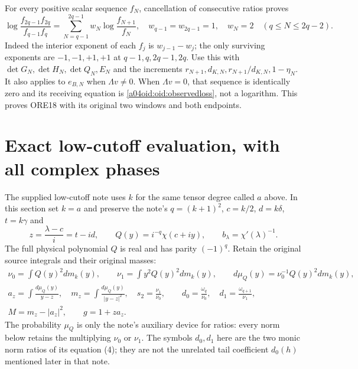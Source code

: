 For every positive scalar sequence $f_N$, cancellation of consecutive
ratios proves
\begin{equation}\label{a04oid:oid:windows}
 \log\frac{f_{2q-1}f_{2q}}{f_{q-1}f_q}
 =\sum_{N=q-1}^{2q-1}w_N\log\frac{f_{N+1}}{f_N},\quad
 w_{q-1}=w_{2q-1}=1,\quad w_N=2\quad(q\le N\le2q-2).
\end{equation}
Indeed the interior exponent of each $f_j$ is $w_{j-1}-w_j$;
the only surviving exponents are $-1,-1,+1,+1$ at
$q-1,q,2q-1,2q$. Use this with $\det G_N,\det H_N,\det Q_N,E_N$
and the increments $r_{N+1},d_{K,N},r_{N+1}/d_{K,N},1-\eta_N$.
It also applies to $e_{B,N}$ when $\Lambda v\ne0$. When
$\Lambda v=0$, that sequence is identically zero and its receiving
equation is \eqref{a04oid:oid:observedloss}, not a logarithm. This proves
ORE18 with its original two windows and both endpoints.

\section{Exact low-cutoff evaluation, with all complex phases}

The supplied low-cutoff note uses $k$ for the same tensor degree
called $a$ above. In this section set $k=a$ and preserve the note's
$q=(k+1)^2$, $c=k/2$, $d=k\delta$, $t=k\gamma$ and
\[
 z=\frac{\lambda-c}{i}=t-id,\qquad
 Q(y)=i^{-q}\chi(c+iy),\qquad b_\lambda=\chi'(\lambda)^{-1}.
\]
The full physical polynomial $Q$ is real and has parity $(-1)^q$.
Retain the original source integrals and their original masses:
\begin{equation}\label{a04oid:oid:moments}
\begin{gathered}
 \nu_0=\int Q(y)^2dm_k(y),\qquad
 \nu_1=\int y^2Q(y)^2dm_k(y),\qquad
 d\mu_Q(y)=\nu_0^{-1}Q(y)^2dm_k(y),\\
 a_z=\int\frac{d\mu_Q(y)}{y-z},\quad
 m_z=\int\frac{d\mu_Q(y)}{|y-z|^2},\quad
 s_2=\frac{\nu_1}{\nu_0},\qquad
 d_0=\frac{\omega_q}{\nu_0},\quad
 d_1=\frac{\omega_{q+1}}{\nu_1},\\
 M=m_z-|a_z|^2,\qquad g=1+za_z.
\end{gathered}
\end{equation}
The probability $\mu_Q$ is only the note's auxiliary device for
ratios: every norm below retains the multiplying $\nu_0$ or $\nu_1$.
The symbols $d_0,d_1$ here are the two monic norm ratios of its
equation (4); they are not the unrelated tail coefficient $d_0(h)$
mentioned later in that note.


